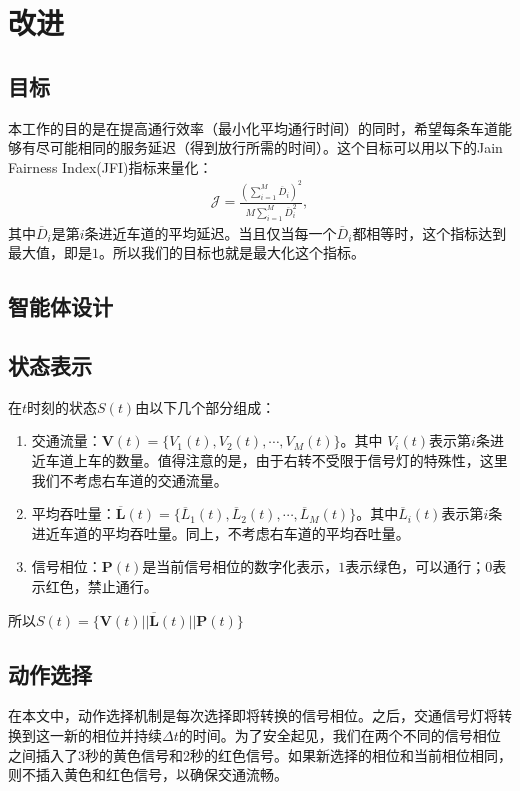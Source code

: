 \section{改进}
\subsection{目标}
本工作的目的是在提高通行效率（最小化平均通行时间）的同时，希望每条车道能够有尽可能相同的服务延迟（得到放行所需的时间）。这个目标可以用以下的Jain Fairness Index(JFI)指标来量化：
\begin{align}
    \mathcal{J} = \frac{(\sum_{i=1}^{M}\overline{D}_i)^2}{M\sum_{i=1}^{M}\overline{D}_i^2},
\end{align}
其中$\overline{D}_i$是第$i$条进近车道的平均延迟。当且仅当每一个$\overline{D}_i$都相等时，这个指标达到最大值，即是$1$。所以我们的目标也就是最大化这个指标。

\subsection{智能体设计}
\subsection*{状态表示}
在$t$时刻的状态$S(t)$由以下几个部分组成：
\begin{enumerate}
\item 交通流量：$\boldsymbol{V}(t)=\{V_1(t),V_2(t),\cdots,V_M(t)\}$。其中 $V_i(t)$表示第$i$条进近车道上车的数量。值得注意的是，由于右转不受限于信号灯的特殊性，这里我们不考虑右车道的交通流量。
\item 平均吞吐量：$\boldsymbol{\overline{L}}(t)=\{\overline{L}_1(t),\overline{L}_2(t),\cdots,\overline{L}_M(t)\}$。其中$\overline{L}_i(t)$表示第$i$条进近车道的平均吞吐量。同上，不考虑右车道的平均吞吐量。
\item 信号相位：$\boldsymbol{P}(t)$是当前信号相位的数字化表示，$1$表示绿色，可以通行；$0$表示红色，禁止通行。
\end{enumerate}
所以$S(t)=\{\boldsymbol{V}(t) || \boldsymbol{\overline{L}}(t) || \boldsymbol{P}(t) \}$
\subsection*{动作选择}
在本文中，动作选择机制是每次选择即将转换的信号相位。之后，交通信号灯将转换到这一新的相位并持续$\Delta t$的时间。为了安全起见，我们在两个不同的信号相位之间插入了3秒的黄色信号和2秒的红色信号。如果新选择的相位和当前相位相同，则不插入黄色和红色信号，以确保交通流畅。
